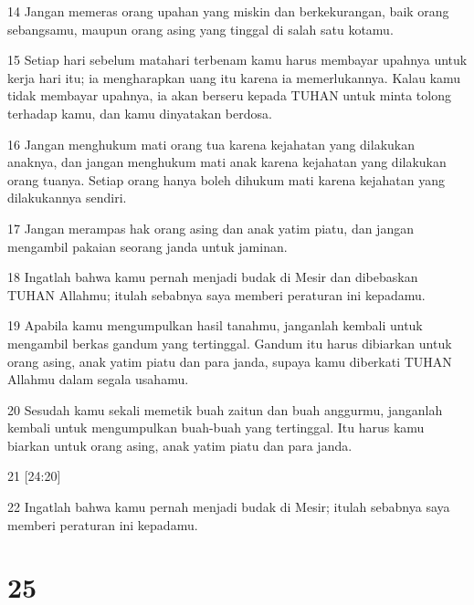 \par 14 Jangan memeras orang upahan yang miskin dan berkekurangan, baik orang sebangsamu, maupun orang asing yang tinggal di salah satu kotamu.
\par 15 Setiap hari sebelum matahari terbenam kamu harus membayar upahnya untuk kerja hari itu; ia mengharapkan uang itu karena ia memerlukannya. Kalau kamu tidak membayar upahnya, ia akan berseru kepada TUHAN untuk minta tolong terhadap kamu, dan kamu dinyatakan berdosa.
\par 16 Jangan menghukum mati orang tua karena kejahatan yang dilakukan anaknya, dan jangan menghukum mati anak karena kejahatan yang dilakukan orang tuanya. Setiap orang hanya boleh dihukum mati karena kejahatan yang dilakukannya sendiri.
\par 17 Jangan merampas hak orang asing dan anak yatim piatu, dan jangan mengambil pakaian seorang janda untuk jaminan.
\par 18 Ingatlah bahwa kamu pernah menjadi budak di Mesir dan dibebaskan TUHAN Allahmu; itulah sebabnya saya memberi peraturan ini kepadamu.
\par 19 Apabila kamu mengumpulkan hasil tanahmu, janganlah kembali untuk mengambil berkas gandum yang tertinggal. Gandum itu harus dibiarkan untuk orang asing, anak yatim piatu dan para janda, supaya kamu diberkati TUHAN Allahmu dalam segala usahamu.
\par 20 Sesudah kamu sekali memetik buah zaitun dan buah anggurmu, janganlah kembali untuk mengumpulkan buah-buah yang tertinggal. Itu harus kamu biarkan untuk orang asing, anak yatim piatu dan para janda.
\par 21 [24:20]
\par 22 Ingatlah bahwa kamu pernah menjadi budak di Mesir; itulah sebabnya saya memberi peraturan ini kepadamu.

\chapter{25}


